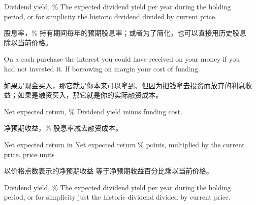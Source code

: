 
\begin{englishblock} Dividend yield, \% The expected dividend yield per year during the holding period, or for simplicity the historic dividend divided by current price. \end{englishblock}

\begin{chineseblock}股息率，\% 持有期间每年的预期股息率；或者为了简化，也可以直接用历史股息除以当前价格。\end{chineseblock}


\begin{englishblock} On a cash purchase the interest you could have received on your money if you had not invested it. If borrowing on margin your cost of funding. \end{englishblock}

\begin{chineseblock}如果是现金买入，那它就是你本来可以拿到、但因为把钱拿去投资而放弃的利息收益；如果是融资买入，那它就是你的实际融资成本。\end{chineseblock}

\bipairgap

\begin{englishblock} Net expected return, \% Dividend yield minus funding cost. \end{englishblock}

\begin{chineseblock}净预期收益，\% 股息率减去融资成本。\end{chineseblock}

\bipairgap

\begin{englishblock} Net expected return in Net expected return \% points, multiplied by the current price. price units \end{englishblock}

\begin{chineseblock}以价格点数表示的净预期收益 等于净预期收益百分比乘以当前价格。\end{chineseblock}


\begin{englishblock} Dividend yield, \% The expected dividend yield per year during the holding period, or for simplicity just the historic dividend divided by current price. \end{englishblock}

